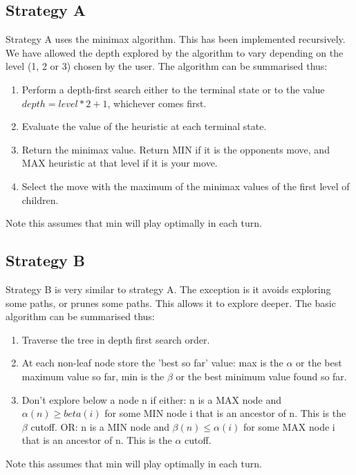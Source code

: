 \documentclass[12pt]{article}
\begin{document}
\subsection{Strategy A}
Strategy A uses the minimax algorithm. This has been implemented recursively. We have allowed the depth explored by the algorithm to vary depending on the level (1, 2 or 3) chosen by the user. The algorithm can be summarised thus:
\begin{enumerate}
\item Perform a depth-first search either to the terminal state or to the value $depth = level*2+1$, whichever comes first.
\item Evaluate the value of the heuristic at each terminal state.
\item Return the minimax value. Return MIN if it is the opponents move, and MAX heuristic at that level if it is your move.
\item Select the move with the maximum of the minimax values of the first level of children.
\end{enumerate}
Note this assumes that min will play optimally in each turn.

\subsection{Strategy B}
Strategy B is very similar to strategy A. The exception is it avoids exploring some paths, or prunes some paths. This allows it to explore deeper. The basic algorithm can be summarised thus:

\begin{enumerate}
\item Traverse the tree in depth first search order.
\item At each non-leaf node store the 'best so far' value: max is the $\alpha$ or the best maximum value so far, min is the $\beta$ or the best minimum value found so far.
\item Don't explore below a node n if either: n is a MAX node and $\alpha(n) \geq beta(i)$ for some MIN node i that is an ancestor of n. This is the $\beta$ cutoff. OR: n is a MIN node and $\beta(n) \leq \alpha(i)$ for some MAX node i that is an ancestor of n. This is the $\alpha$ cutoff.
\end{enumerate}
Note this assumes that min will play optimally in each turn.
\end{document}
